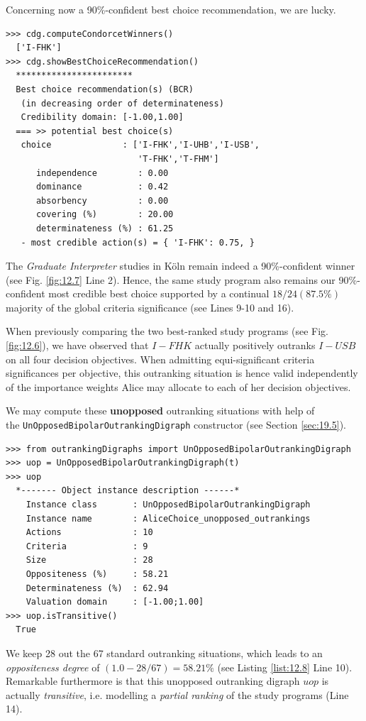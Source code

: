 Concerning now a 90\%-confident best choice recommendation, we are lucky. 

\begin{lstlisting}[caption={Computing the 90\% confident best choice recommendation},label=list:12.7]
>>> cdg.computeCondorcetWinners()
  ['I-FHK']
>>> cdg.showBestChoiceRecommendation()
  ***********************
  Best choice recommendation(s) (BCR)
   (in decreasing order of determinateness)   
   Credibility domain: [-1.00,1.00]
  === >> potential best choice(s)
   choice              : ['I-FHK','I-UHB','I-USB',
                          'T-FHK','T-FHM']
      independence        : 0.00
      dominance           : 0.42
      absorbency          : 0.00
      covering (%)        : 20.00
      determinateness (%) : 61.25
   - most credible action(s) = { 'I-FHK': 0.75, }
\end{lstlisting}
 
The \emph{Graduate Interpreter} studies in Köln remain indeed a 90\%-confident \Condorcet winner (see Fig. \ref{fig:12.7} Line 2). Hence, the same study program also remains our 90\%-confident most credible best choice supported by a continual $18/24 (87.5\%)$ majority of the global criteria significance (see Lines 9-10 and 16).

When previously comparing the two best-ranked study programs (see Fig. \ref{fig:12.6}), we have observed that $I-FHK$ actually positively outranks $I-USB$ on all four decision objectives. When admitting equi-significant criteria significances per objective, this outranking situation is hence valid independently of the importance weights Alice may allocate to each of her decision objectives. 

We may compute these \textbf{unopposed} outranking situations with help of\\ the \texttt{UnOpposedBipolarOutrankingDigraph} constructor (see Section \ref{sec:19.5}).

\begin{lstlisting}[caption={Computing the unopposed outranking situations},label=list:12.8]
>>> from outrankingDigraphs import UnOpposedBipolarOutrankingDigraph
>>> uop = UnOpposedBipolarOutrankingDigraph(t)
>>> uop
  *------- Object instance description ------*
    Instance class       : UnOpposedBipolarOutrankingDigraph
    Instance name        : AliceChoice_unopposed_outrankings
    Actions              : 10
    Criteria             : 9
    Size                 : 28
    Oppositeness (%)     : 58.21
    Determinateness (%)  : 62.94
    Valuation domain     : [-1.00;1.00]
>>> uop.isTransitive()
  True
\end{lstlisting}
We keep 28 out the 67 standard outranking situations, which leads to an \emph{oppositeness degree} of $(1.0 - 28/67) = 58.21\%$ (see Listing \ref{list:12.8} Line 10). Remarkable furthermore is that this unopposed outranking digraph $uop$ is actually \emph{transitive}, i.e. modelling a \emph{partial ranking} of the study programs (Line 14).

